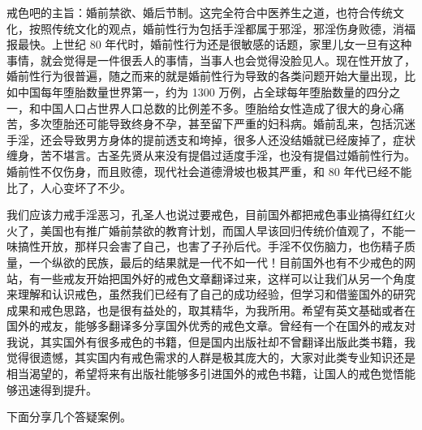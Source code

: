 戒色吧的主旨：婚前禁欲、婚后节制。这完全符合中医养生之道，也符合传统文化，按照传统文化的观点，婚前性行为包括手淫都属于邪淫，邪淫伤身败德，消福报最快。上世纪 80 年代时，婚前性行为还是很敏感的话题，家里儿女一旦有这种事情，就会觉得是一件很丢人的事情，当事人也会觉得没脸见人。现在性开放了，婚前性行为很普遍，随之而来的就是婚前性行为导致的各类问题开始大量出现，比如中国每年堕胎数量世界第一，约为 1300 万例，占全球每年堕胎数量的四分之一，和中国人口占世界人口总数的比例差不多。堕胎给女性造成了很大的身心痛苦，多次堕胎还可能导致终身不孕，甚至留下严重的妇科病。婚前乱来，包括沉迷手淫，还会导致男方身体的提前透支和垮掉，很多人还没结婚就已经废掉了，症状缠身，苦不堪言。古圣先贤从来没有提倡过适度手淫，也没有提倡过婚前性行为。婚前性不仅伤身，而且败德，现代社会道德滑坡也极其严重，和 80 年代已经不能比了，人心变坏了不少。

我们应该力戒手淫恶习，孔圣人也说过要戒色，目前国外都把戒色事业搞得红红火火了，美国也有推广婚前禁欲的教育计划，而国人早该回归传统价值观了，不能一味搞性开放，那样只会害了自己，也害了子孙后代。手淫不仅伤脑力，也伤精子质量，一个纵欲的民族，最后的结果就是一代不如一代！目前国外也有不少戒色的网站，有一些戒友开始把国外好的戒色文章翻译过来，这样可以让我们从另一个角度来理解和认识戒色，虽然我们已经有了自己的成功经验，但学习和借鉴国外的研究成果和戒色思路，也是很有益处的，取其精华，为我所用。希望有英文基础或者在国外的戒友，能够多翻译多分享国外优秀的戒色文章。曾经有一个在国外的戒友对我说，其实国外有很多戒色的书籍，但是国内出版社却不曾翻译出版此类书籍，我觉得很遗憾，其实国内有戒色需求的人群是极其庞大的，大家对此类专业知识还是相当渴望的，希望将来有出版社能够多引进国外的戒色书籍，让国人的戒色觉悟能够迅速得到提升。

下面分享几个答疑案例。

